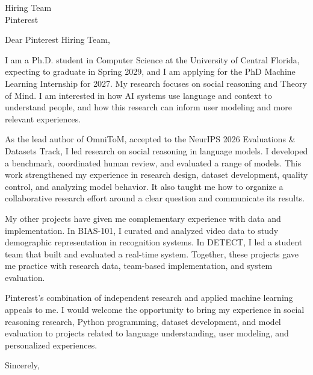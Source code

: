 \documentclass[11pt]{letter}
\begin{document}
\begin{letter}{Hiring Team\\Pinterest}
\date{October 16, 2026}
\opening{Dear Pinterest Hiring Team,}

I am a Ph.D. student in Computer Science at the University of Central Florida, expecting to graduate in Spring 2029, and I am applying for the PhD Machine Learning Internship for 2027. My research focuses on social reasoning and Theory of Mind. I am interested in how AI systems use language and context to understand people, and how this research can inform user modeling and more relevant experiences.

As the lead author of OmniToM, accepted to the NeurIPS 2026 Evaluations \& Datasets Track, I led research on social reasoning in language models. I developed a benchmark, coordinated human review, and evaluated a range of models. This work strengthened my experience in research design, dataset development, quality control, and analyzing model behavior. It also taught me how to organize a collaborative research effort around a clear question and communicate its results.

My other projects have given me complementary experience with data and implementation. In BIAS-101, I curated and analyzed video data to study demographic representation in recognition systems. In DETECT, I led a student team that built and evaluated a real-time system. Together, these projects gave me practice with research data, team-based implementation, and system evaluation.

Pinterest's combination of independent research and applied machine learning appeals to me. I would welcome the opportunity to bring my experience in social reasoning research, Python programming, dataset development, and model evaluation to projects related to language understanding, user modeling, and personalized experiences.

\closing{Sincerely,}
\end{letter}
\end{document}
